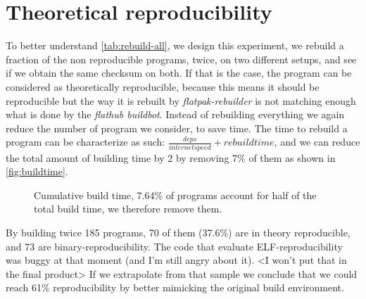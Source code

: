 \documentclass[a4paper,11pt,oneside]{report}
\newcommand{\sysname}{\emph{flatpak-rebuilder}\xspace}
\newcommand{\fhbb}{\emph{flathub buildbot}\xspace}
\begin{document}
\section{Theoretical reproducibility}
\label{sec:theo-repro}
To better understand \autoref{tab:rebuild-all}, we design this experiment, we
rebuild a fraction of the non reproducible programs, twice, on two different
setups, and see if we obtain the same checksum on both. If that is the case,
the program can be considered as theoretically reproducible, because this means
it should be reproducible but the way it is rebuilt by \sysname is not matching
enough what is done by the \fhbb. Instead of rebuilding everything we again
reduce the number of program we consider, to save time. The time to rebuild a
program can be characterize as such: $\frac{deps}{internet speed} + rebuild
time$, and we can reduce the total amount of building time by 2 by removing 7\%
of them as shown in \autoref{fig:buildtime}.

\begin{figure}[h]
    \caption{Cumulative build time, 7.64\% of programs
    account for half of the total build time, we therefore remove them.}
    \label{fig:buildtime}
\end{figure}

By building twice 185 programs, 70 of them (37.6\%) are in theory reproducible,
and 73 are binary-reproducibility. The code that evaluate ELF-reproducibility
was buggy at that moment (and I'm still angry about it). <I won't put that in
the final product>
If we extrapolate from that sample we conclude that we could reach 61\%
reproducibility by better mimicking the original build environment.
\end{document}
